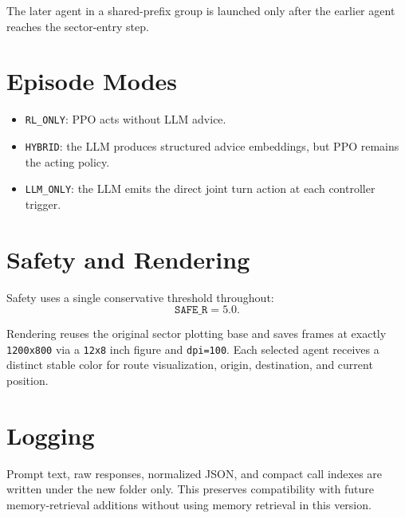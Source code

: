 \documentclass[11pt]{article}
\begin{document}
The later agent in a shared-prefix group is launched only after the earlier agent reaches the sector-entry step.

\section{Episode Modes}
\begin{itemize}[leftmargin=*]
\item \texttt{RL\_ONLY}: PPO acts without LLM advice.
\item \texttt{HYBRID}: the LLM produces structured advice embeddings, but PPO remains the acting policy.
\item \texttt{LLM\_ONLY}: the LLM emits the direct joint turn action at each controller trigger.
\end{itemize}

\section{Safety and Rendering}
Safety uses a single conservative threshold throughout:
\[
\texttt{SAFE\_R} = 5.0.
\]

Rendering reuses the original sector plotting base and saves frames at exactly \texttt{1200x800} via a \texttt{12x8} inch figure and \texttt{dpi=100}. Each selected agent receives a distinct stable color for route visualization, origin, destination, and current position.

\section{Logging}
Prompt text, raw responses, normalized JSON, and compact call indexes are written under the new folder only. This preserves compatibility with future memory-retrieval additions without using memory retrieval in this version.
\end{document}
